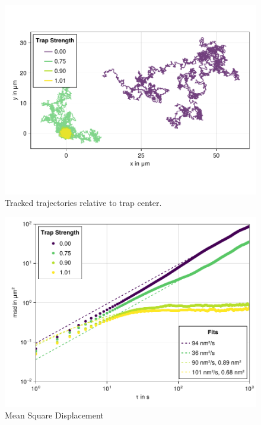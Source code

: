 \documentclass[
    parskip=half, 
    twoside=false,
    twocolumn=true,
    fontsize=11pt,
]{scrarticle}
\begin{document}
\begin{figure}[h]
    \centering
    \includegraphics{figures/01_02_1_trajectories.pdf}
    \caption{Tracked trajectories relative to trap center.}
\end{figure}

\begin{figure}[h]
    \centering
    \includegraphics{figures/01_02_2_msd.pdf}
    \caption{Mean Square Displacement}
\end{figure}
\end{document}
